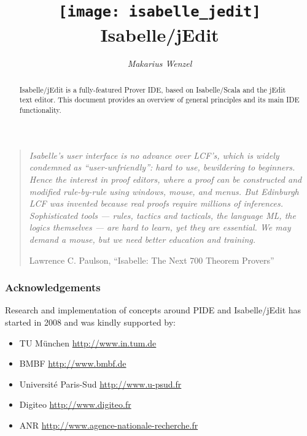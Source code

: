\documentclass[12pt,a4paper]{report}
\title{\texttt{[image: isabelle\_jedit]} \\[4ex] Isabelle/jEdit}
\author{\emph{Makarius Wenzel}}
\begin{document}
\maketitle

\begin{abstract}
  Isabelle/jEdit is a fully-featured Prover IDE, based on Isabelle/Scala and
  the jEdit text editor. This document provides an overview of general
  principles and its main IDE functionality.
\end{abstract}

\vspace*{2.5cm}

\begin{quote}
  {\small\em Isabelle's user interface is no advance over LCF's, which is
  widely condemned as ``user-unfriendly'': hard to use, bewildering to
  beginners. Hence the interest in proof editors, where a proof can be
  constructed and modified rule-by-rule using windows, mouse, and menus. But
  Edinburgh LCF was invented because real proofs require millions of
  inferences. Sophisticated tools --- rules, tactics and tacticals, the
  language ML, the logics themselves --- are hard to learn, yet they are
  essential. We may demand a mouse, but we need better education and
  training.}

  Lawrence C. Paulson, ``Isabelle: The Next 700 Theorem Provers''
\end{quote}


\vspace*{2.5cm}


\subsubsection*{Acknowledgements}

Research and implementation of concepts around PIDE and Isabelle/jEdit has
started in 2008 and was kindly supported by:
\begin{itemize}
\item TU M\"unchen \url{http://www.in.tum.de}
\item BMBF \url{http://www.bmbf.de}
\item Universit\'e Paris-Sud \url{http://www.u-psud.fr}
\item Digiteo \url{http://www.digiteo.fr}
\item ANR \url{http://www.agence-nationale-recherche.fr}
\end{itemize}


\tableofcontents
\listoffigures
\clearfirst



\begingroup
  \tocentry{\bibname}
   \small\raggedright\frenchspacing
  
\endgroup

\tocentry{\indexname}
\printindex
\end{document}
